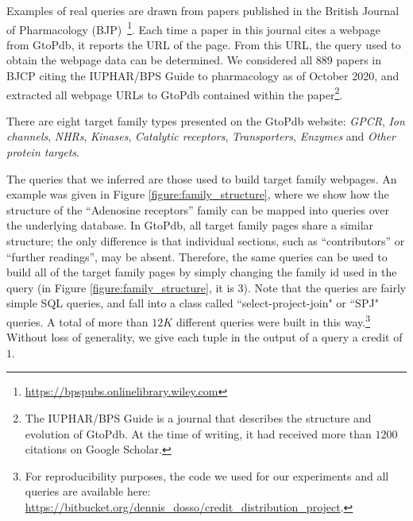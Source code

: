 

Examples of real queries are drawn
from papers published in the British Journal of Pharmacology (BJP)~\footnote{\url{https://bpspubs.onlinelibrary.wiley.com}}.  Each time a paper in this journal cites a webpage from GtoPdb, it reports the URL of the page. From this URL, the query used to obtain the webpage data can be determined. 
We considered all $889$ papers in BJCP citing the IUPHAR/BPS Guide to pharmacology \citep{iuphar2018} as of October 2020, and extracted all webpage URLs to GtoPdb contained within the paper\footnote{The IUPHAR/BPS Guide is a journal that describes the structure and evolution of GtoPdb. At the time of writing, it had received more than $1200$ citations on Google Scholar.}.

There are eight target family types presented on the GtoPdb website: \emph{GPCR}, \emph{Ion channels}, \emph{NHRs}, \emph{Kinases}, \emph{Catalytic receptors}, \emph{Transporters}, \emph{Enzymes} and \emph{Other protein targets}.  

The queries that we inferred are those used to build target family webpages.  An example was given in Figure \ref{figure:family_structure}, where we show how the structure of the ``Adenosine receptors'' family can be mapped into  queries over the underlying database. %
In GtoPdb, all target family pages share a similar structure; the only difference is that individual sections, such as ``contributors'' or ``further readings'', may be absent.
Therefore, the same queries can be used to build all of the target family pages by simply changing the family id used in the query (in Figure \ref{figure:family_structure}, it is 3).
Note that the queries are fairly simple SQL queries, and fall into a class called ``select-project-join" or ``SPJ" queries. 
A total of more than $12K$ different queries were built in this way.\footnote{For reproducibility purposes, the code we used for our experiments and all queries are available here: \url{https://bitbucket.org/dennis_dosso/credit_distribution_project}.}
Without loss of generality, we give each tuple in the output of a query a credit of $1$.

